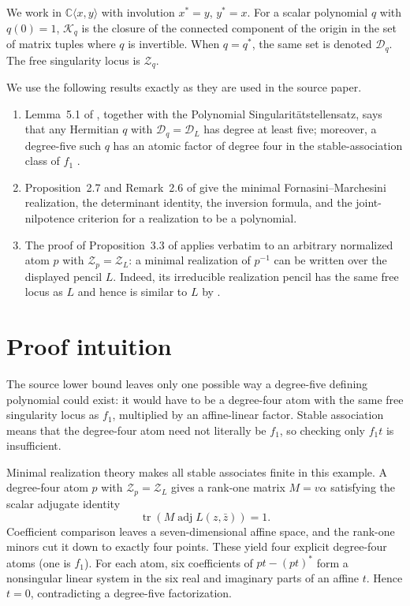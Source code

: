\documentclass[11pt]{article}
\newcommand{\C}{\mathbb C}
\newcommand{\D}{\mathcal D}
\newcommand{\K}{\mathcal K}
\newcommand{\Z}{\mathcal Z}
\newcommand{\adj}{\operatorname{adj}}
\newcommand{\tr}{\operatorname{tr}}
\begin{document}
We work in $\C\langle x,y\rangle$ with involution $x^*=y$, $y^*=x$.  For a scalar polynomial $q$ with $q(0)=1$, $\K_q$ is the closure of the connected component of the origin in the set of matrix tuples where $q$ is invertible.  When $q=q^*$, the same set is denoted $\D_q$.  The free singularity locus is $\Z_q$.

We use the following results exactly as they are used in the source paper.
\begin{enumerate}
\item Lemma~5.1 of \cite{HKMV}, together with the Polynomial Singularit\"atstellensatz, says that any Hermitian $q$ with $\D_q=\D_L$ has degree at least five; moreover, a degree-five such $q$ has an atomic factor of degree four in the stable-association class of $f_1$ \cite[Theorem~4.3]{HKV}.
\item Proposition~2.7 and Remark~2.6 of \cite{HKMV} give the minimal Fornasini--Marchesini realization, the determinant identity, the inversion formula, and the joint-nilpotence criterion for a realization to be a polynomial.
\item The proof of Proposition~3.3 of \cite{HKMV} applies verbatim to an arbitrary normalized atom $p$ with $\Z_p=\Z_L$: a minimal realization of $p^{-1}$ can be written over the displayed pencil $L$.  Indeed, its irreducible realization pencil has the same free locus as $L$ and hence is similar to $L$ by \cite[Theorem~3.11]{KV}.
\end{enumerate}

\section{Proof intuition}

The source lower bound leaves only one possible way a degree-five defining polynomial could exist: it would have to be a degree-four atom with the same free singularity locus as $f_1$, multiplied by an affine-linear factor.  Stable association means that the degree-four atom need not literally be $f_1$, so checking only $f_1t$ is insufficient.

Minimal realization theory makes all stable associates finite in this example.  A degree-four atom $p$ with $\Z_p=\Z_L$ gives a rank-one matrix $M=v\alpha$ satisfying the scalar adjugate identity
\[
\tr(M\adj L(z,\bar z))=1.
\]
Coefficient comparison leaves a seven-dimensional affine space, and the rank-one minors cut it down to exactly four points.  These yield four explicit degree-four atoms (one is $f_1$).  For each atom, six coefficients of $pt-(pt)^*$ form a nonsingular linear system in the six real and imaginary parts of an affine $t$.  Hence $t=0$, contradicting a degree-five factorization.
\end{document}
